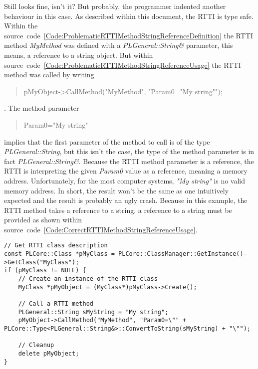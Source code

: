 Still looks fine, isn't it? But probably, the programmer indented another behaviour in this case. As described within this document, the RTTI is type safe. Within the source~code~\ref{Code:ProblematicRTTIMethodStringReferenceDefinition} the RTTI method \emph{MyMethod} was defined with a \emph{PLGeneral::String\&} parameter, this means, a reference to a string object. But within source~code~\ref{Code:ProblematicRTTIMethodStringReferenceUsage} the RTTI method was called by writing \begin{quote}pMyObject->CallMethod("MyMethod", "Param0="My string"");\end{quote}. The method parameter \begin{quote}Param0="My string"\end{quote} implies that the first parameter of the method to call is of the type \emph{PLGeneral::String}, but this isn't the case, the type of the method parameter is in fact \emph{PLGeneral::String\&}. Because the RTTI method parameter is a reference, the RTTI is interpreting the given \emph{Param0} value as a reference, meaning a memory address. Unfortunately, for the most computer systems, \emph{"My string"} is no valid memory address. In short, the result won't be the same as one intuitively expected and the result is probably an ugly crash. Because in this example, the RTTI method takes a reference to a string, a reference to a string must be provided as shown within source~code~\ref{Code:CorrectRTTIMethodStringReferenceUsage}.
\begin{lstlisting}[label=Code:CorrectRTTIMethodStringReferenceUsage,caption={Correct RTTI method and string reference parameter usage}]
// Get RTTI class description
const PLCore::Class *pMyClass = PLCore::ClassManager::GetInstance()->GetClass("MyClass");
if (pMyClass != NULL) {
	// Create an instance of the RTTI class
	MyClass *pMyObject = (MyClass*)pMyClass->Create();

	// Call a RTTI method
	PLGeneral::String sMyString = "My string";
	pMyObject->CallMethod("MyMethod", "Param0=\"" + PLCore::Type<PLGeneral::String&>::ConvertToString(sMyString) + "\"");

	// Cleanup
	delete pMyObject;
}
\end{lstlisting}
